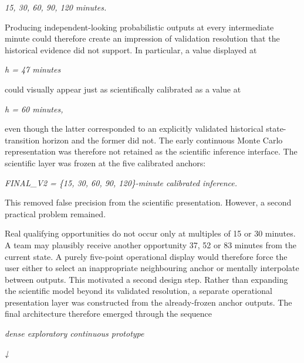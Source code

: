 \begin{center}\textit{15, 30, 60, 90, 120 minutes.}\end{center}

Producing independent-looking probabilistic outputs at every intermediate minute could therefore create an impression of validation resolution that the historical evidence did not support. In particular, a value displayed at

\begin{center}\textit{h = 47 minutes}\end{center}

could visually appear just as scientifically calibrated as a value at

\begin{center}\textit{h = 60 minutes,}\end{center}

even though the latter corresponded to an explicitly validated historical state-transition horizon and the former did not. The early continuous Monte Carlo representation was therefore not retained as the scientific inference interface. The scientific layer was frozen at the five calibrated anchors:

\begin{center}\textit{FINAL\_V2 = \{15, 30, 60, 90, 120\}-minute calibrated inference.}\end{center}

This removed false precision from the scientific presentation. However, a second practical problem remained.

Real qualifying opportunities do not occur only at multiples of 15 or 30 minutes. A team may plausibly receive another opportunity 37, 52 or 83 minutes from the current state. A purely five-point operational display would therefore force the user either to select an inappropriate neighbouring anchor or mentally interpolate between outputs. This motivated a second design step. Rather than expanding the scientific model beyond its validated resolution, a separate operational presentation layer was constructed from the already-frozen anchor outputs. The final architecture therefore emerged through the sequence

\begin{center}\textit{dense exploratory continuous prototype}\end{center}

\begin{center}\textit{↓}\end{center}

